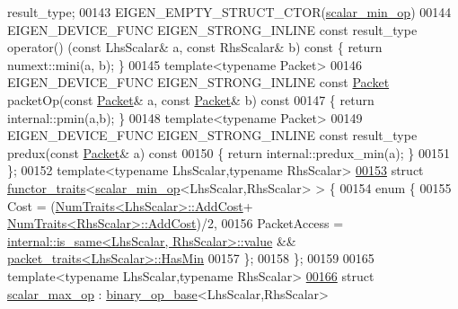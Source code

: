 \begin{DoxyCode}
       result\_type;
00143   EIGEN\_EMPTY\_STRUCT\_CTOR(\hyperlink{struct_eigen_1_1internal_1_1scalar__min__op}{scalar\_min\_op})
00144   EIGEN\_DEVICE\_FUNC EIGEN\_STRONG\_INLINE \textcolor{keyword}{const} result\_type operator() (\textcolor{keyword}{const} LhsScalar& a, \textcolor{keyword}{const} RhsScalar& 
      b)\textcolor{keyword}{ const }\{ \textcolor{keywordflow}{return} numext::mini(a, b); \}
00145   \textcolor{keyword}{template}<\textcolor{keyword}{typename} Packet>
00146   EIGEN\_DEVICE\_FUNC EIGEN\_STRONG\_INLINE \textcolor{keyword}{const} \hyperlink{union_eigen_1_1internal_1_1_packet}{Packet} packetOp(\textcolor{keyword}{const} \hyperlink{union_eigen_1_1internal_1_1_packet}{Packet}& a, \textcolor{keyword}{const} 
      \hyperlink{union_eigen_1_1internal_1_1_packet}{Packet}& b)\textcolor{keyword}{ const}
00147 \textcolor{keyword}{  }\{ \textcolor{keywordflow}{return} internal::pmin(a,b); \}
00148   \textcolor{keyword}{template}<\textcolor{keyword}{typename} Packet>
00149   EIGEN\_DEVICE\_FUNC EIGEN\_STRONG\_INLINE \textcolor{keyword}{const} result\_type predux(\textcolor{keyword}{const} \hyperlink{union_eigen_1_1internal_1_1_packet}{Packet}& a)\textcolor{keyword}{ const}
00150 \textcolor{keyword}{  }\{ \textcolor{keywordflow}{return} internal::predux\_min(a); \}
00151 \};
00152 \textcolor{keyword}{template}<\textcolor{keyword}{typename} LhsScalar,\textcolor{keyword}{typename} RhsScalar>
\hyperlink{struct_eigen_1_1internal_1_1functor__traits_3_01scalar__min__op_3_01_lhs_scalar_00_01_rhs_scalar_01_4_01_4}{00153} \textcolor{keyword}{struct }\hyperlink{struct_eigen_1_1internal_1_1functor__traits}{functor\_traits}<\hyperlink{struct_eigen_1_1internal_1_1scalar__min__op}{scalar\_min\_op}<LhsScalar,RhsScalar> > \{
00154   \textcolor{keyword}{enum} \{
00155     Cost = (\hyperlink{group___core___module_struct_eigen_1_1_num_traits}{NumTraits<LhsScalar>::AddCost}+
      \hyperlink{group___core___module_struct_eigen_1_1_num_traits}{NumTraits<RhsScalar>::AddCost})/2,
00156     PacketAccess = \hyperlink{struct_eigen_1_1internal_1_1is__same}{internal::is\_same<LhsScalar, RhsScalar>::value}
       && \hyperlink{struct_eigen_1_1internal_1_1packet__traits}{packet\_traits<LhsScalar>::HasMin}
00157   \};
00158 \};
00159 
00165 \textcolor{keyword}{template}<\textcolor{keyword}{typename} LhsScalar,\textcolor{keyword}{typename} RhsScalar>
\hyperlink{struct_eigen_1_1internal_1_1scalar__max__op}{00166} \textcolor{keyword}{struct }\hyperlink{struct_eigen_1_1internal_1_1scalar__max__op}{scalar\_max\_op}  : \hyperlink{struct_eigen_1_1internal_1_1binary__op__base}{binary\_op\_base}<LhsScalar,RhsScalar>

\end{DoxyCode}
